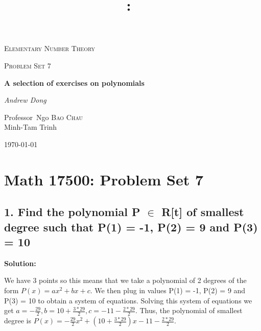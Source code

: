 \documentclass{article}
\title{\vspace{2in}\textmd{\textbf{\hmwkClass:\ \hmwkTitle}}\\\normalsize\vspace{0.1in}\vspace{0.1in}\large{\textit{\hmwkClassInstructor}}\vspace{3in}}
\date{}
\author{\textbf{\hmwkAuthorName}}
\begin{document}
\begin{spacing}{1.1}
\newpage

\begin{titlepage}
	\centering
	{\scshape\LARGE Elementary Number Theory \par}
	\vspace{1cm}
	{\scshape\Large Problem Set 7\par}
	\vspace{1.5cm}
	{\huge\bfseries A selection of exercises on polynomials\par}
	\vspace{1cm}
	{\Large\itshape Andrew Dong\par}
	\vspace{2cm}

	\vfill


	Professor~Ngo \textsc{Bao Chau}
	\\ Minh-Tam Trinh
	\vspace{5 mm}
	\\{\large \today\par}
\end{titlepage}


\clearpage

\section{Math 17500: Problem Set 7}

\subsection{1.  Find the polynomial P $\in$ R[t] of smallest degree such that P(1) = -1, P(2) = 9 and P(3) = 10}

\textbf{Solution: }

We have 3 points so this means that we take a polynomial of 2 degrees of the form $P(x)= ax^2 + bx + c$.  We then plug in values P(1) = -1, P(2) = 9 and P(3) = 10 to obtain a system of equations.  Solving this system of equations we get $a = -\frac{29}{2}, b = 10 + \frac{3 * 29}{2}, c = -11 - \frac{2 * 29}{2}$.  Thus, the polynomial of smallest degree is $P(x) = -\frac{29}{2}x^2 +(10 + \frac{3 * 29}{2})x -11 - \frac{2 * 29}{2}$.  


\end{spacing}
\end{document}
